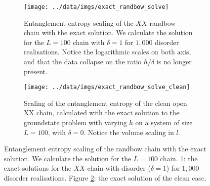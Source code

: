 \begin{figure}
     \centering
     \begin{subfigure}[b]{0.8\textwidth}
   \centering
	\texttt{[image: ../data/imgs/exact\_randbow\_solve]}
	\caption{Entanglement entropy scaling of the $XX$ randbow chain with the exact solution. We calculate the solution for the $L = 100$ chain with $\delta = 1$ for $1,000$ disorder realisations. Notice the logarithmic scales on both axis, and that the data collapse on the ratio $h / \delta$ is no longer present.}
	\label{fig:exact_randbow_solve} 
	\end{subfigure}%
   \hfill
     \begin{subfigure}[b]{0.8\textwidth}
     \centering
	\texttt{[image: ../data/imgs/exact\_randbow\_solve\_clean]}
	\caption{Scaling of the entanglement entropy of the clean open XX chain, calculated with the exact solution to the groundstate problem with varying $h$ on a system of size $L = 100$, with $\delta = 0$. Notice the volume scaling in $l$.}
	\label{fig:exact_randbow_solve_clean}
        \end{subfigure}
           \caption{Entanglement entropy scaling of the randbow chain with the exact solution. We calculate the solution for the $L = 100$ chain. \ref{fig:exact_randbow_solve}: the exact solutions for the $XX$ chain with disorder ($\delta = 1$) for $1,000$ disorder realisations. Figure \ref{fig:exact_randbow_solve_clean}: the exact solution of the clean case.}
       \label{fig:exact_randbow_entropy}
\end{figure}